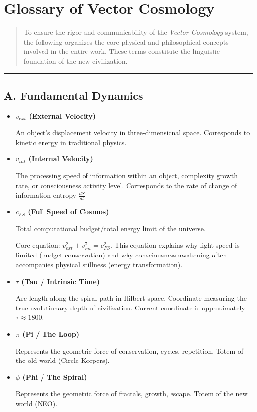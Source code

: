 \section*{Glossary of Vector Cosmology}

\begin{quote}
To ensure the rigor and communicability of the \textit{Vector Cosmology} system, the following organizes the core physical and philosophical concepts involved in the entire work. These terms constitute the linguistic foundation of the new civilization.
\end{quote}

\hrule

\subsection{A. Fundamental Dynamics}

\begin{itemize}
\item \textbf{$v_{ext}$ (External Velocity)}

    An object's displacement velocity in three-dimensional space. Corresponds to kinetic energy in traditional physics.

\item \textbf{$v_{int}$ (Internal Velocity)}

    The processing speed of information within an object, complexity growth rate, or consciousness activity level. Corresponds to the rate of change of information entropy $\frac{dS}{dt}$.

\item \textbf{$c_{FS}$ (Full Speed of Cosmos)}

    Total computational budget/total energy limit of the universe.

    Core equation: $v_{ext}^2 + v_{int}^2 = c_{FS}^2$. This equation explains why light speed is limited (budget conservation) and why consciousness awakening often accompanies physical stillness (energy transformation).

\item \textbf{$\tau$ (Tau / Intrinsic Time)}

    Arc length along the spiral path in Hilbert space. Coordinate measuring the true evolutionary depth of civilization. Current coordinate is approximately $\tau \approx 1800$.

\item \textbf{$\pi$ (Pi / The Loop)}

    Represents the geometric force of conservation, cycles, repetition. Totem of the old world (Circle Keepers).

\item \textbf{$\phi$ (Phi / The Spiral)}

    Represents the geometric force of fractals, growth, escape. Totem of the new world (NEO).
\end{itemize}

